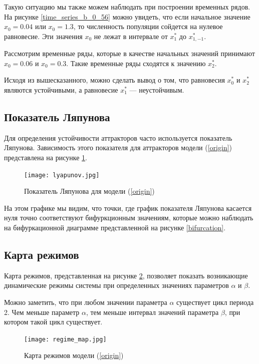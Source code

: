         Такую ситуацию мы также можем наблюдать при построении временных рядов. На рисунке \ref{time_series_b_0_56} можно увидеть, что если начальное значение \(x_0 = 0.04\) или \(x_0 = 1.3\), то численность популяции сойдется на нулевое равновесие. Эти значения \(x_0\) не лежат в интервале от \(x_1^*\) до \(x_{1, -1}^*\).

        Рассмотрим временные ряды, которые в качестве начальных значений принимают \(x_0 = 0.06\) и \(x_0 = 0.3\). Такие временные ряды сходятся к значению \(x_2^*\).

        Исходя из вышесказанного, можно сделать вывод о том, что равновесия \(x_0^*\) и \(x_2^*\) являются устойчивыми, а равновесие \(x_1^*\) --- неустойчивым.

    \subsection{Показатель Ляпунова}    

        Для определения устойчивости аттракторов часто используется показатель Ляпунова. Зависимость этого показателя для аттракторов модели (\ref{origin}) представлена на рисунке \ref{lyapunov}. 

        \begin{figure}
            \centering
            \texttt{[image: lyapunov.jpg]}

            \captionsetup{justification=centering}
            \caption{Показатель Ляпунова для модели (\ref{origin})}
            \label{lyapunov}
        \end{figure}

        На этом графике мы видим, что точки, где график показателя Ляпунова касается нуля точно соответствуют бифуркционным значениям, которые можно наблюдать на бифуркационной диаграмме представленной на рисунке \ref{bifurcation}.

    \subsection{Карта режимов}

        Карта режимов, представленная на рисунке \ref{regimeMap}, позволяет показать возникающие динамические режимы системы при определенных значениях параметров \(\alpha\) и \(\beta\).

        Можно заметить, что при любом значении параметра \(\alpha\) существует цикл периода  2. Чем меньше параметр \(\alpha\), тем меньше интервал значений параметра \(\beta\), при котором такой цикл существует.

        \begin{figure}
            \centering
            \texttt{[image: regime\_map.jpg]}

            \captionsetup{justification=centering}
            \caption{Карта режимов модели (\ref{origin})}
            \label{regimeMap}
        \end{figure}